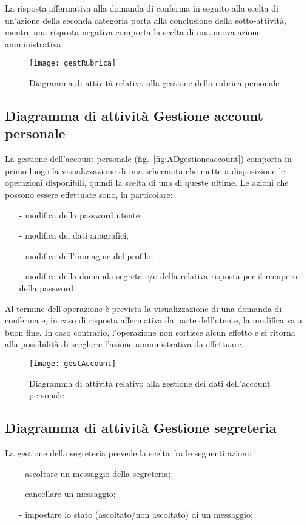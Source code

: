 La risposta affermativa alla domanda di conferma in seguito alla scelta di un'azione della seconda categoria porta alla conclusione della sotto-attività, mentre una risposta negativa comporta la scelta di una nuova azione amministrativa.

\begin{figure}[H]
  \centering
  \texttt{[image: gestRubrica]}
  \caption{Diagramma di attività relativo alla gestione della rubrica personale}\label{fig:ADgestionerubrica}
\end{figure}

\subsection{Diagramma di attività Gestione account personale}
La gestione dell'account personale (fig.~\vref{fig:ADgestioneaccount}) comporta in primo luogo la visualizzazione di una schermata che mette a disposizione le operazioni disponibili, quindi la scelta di una di queste ultime. Le azioni che possono essere effettuate sono, in particolare:
\begin{itemize}[noitemsep,nolistsep]
  \item[-] modifica della password utente;
  \item[-] modifica dei dati anagrafici;
  \item[-] modifica dell'immagine del profilo;
  \item[-] modifica della domanda segreta e/o della relativa risposta per il recupero della password.
\end{itemize}

Al termine dell'operazione è prevista la visualizzazione di una domanda di conferma e, in caso di risposta affermativa da parte dell'utente, la modifica va a buon fine. In caso contrario, l'operazione non sortisce alcun effetto e si ritorna alla possibilità di scegliere l'azione amministrativa da effettuare.

\begin{figure}[H]
  \centering
  \texttt{[image: gestAccount]}
  \caption{Diagramma di attività relativo alla gestione dei dati dell'account personale}\label{fig:ADgestioneaccount}
\end{figure}

\subsection{Diagramma di attività Gestione segreteria}
La gestione della segreteria prevede la scelta fra le seguenti azioni:
\begin{itemize}[noitemsep,nolistsep]
 \item[-] ascoltare un messaggio della segreteria;
 \item[-] cancellare un messaggio;
 \item[-] impostare lo stato (ascoltato/non ascoltato) di un messaggio;
\end{itemize}

